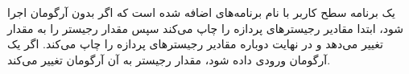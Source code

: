 یک برنامه سطح کاربر با نام 
برنامه‌های 
اضافه شده است که اگر بدون آرگومان اجرا شود، ابتدا مقادیر رجیسترهای پردازه‌ را چاپ می‌کند سپس مقدار رجیستر 
را به مقدار 
تغییر می‌دهد و در نهایت دوباره مقادیر رجیسترهای پردازه‌ را چاپ می‌کند. اگر یک آرگومان ورودی داده شود، مقدار رجیستر به آن آرگومان تغییر می‌کند.